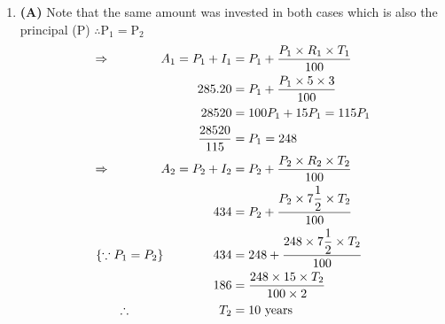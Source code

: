 \begin{multicols}{2}
\begin{enumerate}[label={\textbf{\arabic*.}}]
\begin{enumerate}[label={\arabic*.}]
    \item \textbf{(A)} Note that the same amount was invested in both cases which is also the principal (P) 
    \( \therefore \text{P}_1 = \text{P}_2\)
    \begin{align*} 
        \Rightarrow \hspace{40px} A_1 = P_1 + I_1 &= P_1 + \dfrac{P_1 \times R_1 \times T_1}{100} \\
        285.20&= P_1 + \dfrac{P_1 \times 5 \times 3}{100} \\
         28520 &= 100P_1 + 15P_1 = 115P_1 \\
         \dfrac{28520}{115}&= P_1 = 248 \\
        \Rightarrow \hspace{40px}  A_2 = P_2 + I_2 &= P_2 + \dfrac{P_2 \times R_2 \times T_2}{100} \\
        434&= P_2 + \dfrac{P_2 \times 7\dfrac{1}{2} \times T_2}{100} \\
        \{ \because P_1 = P_2\} \hspace{40px} 434&= 248 + \dfrac{248 \times 7\dfrac{1}{2} \times T_2}{100} \\
        186 &= \dfrac{248 \times 15 \times T_2}{100 \times 2} \\
        \therefore \hspace{70px} T_2 & = 10 \text{ years}
    \end{align*}
    

\end{enumerate}
\end{enumerate}
\end{multicols}
